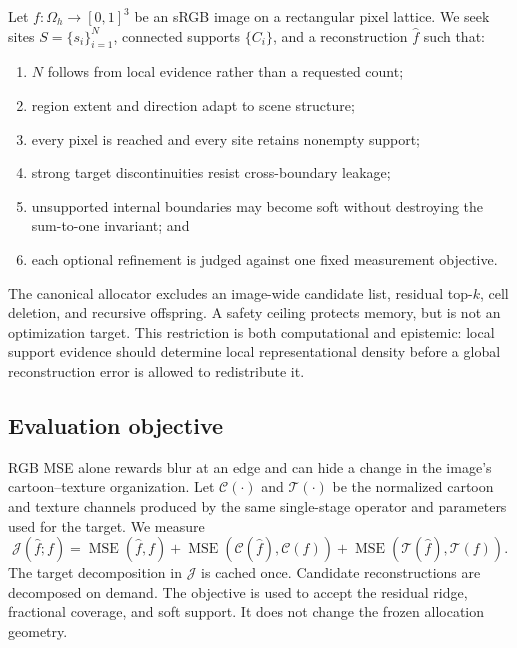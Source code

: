 \documentclass[11pt,letterpaper]{article}
\newcommand{\OmegaD}{\Omega_h}
\begin{document}
Let \(f:\OmegaD\rightarrow[0,1]^3\) be an sRGB image on a rectangular pixel
lattice. We seek sites \(S=\{s_i\}_{i=1}^N\), connected supports
\(\{C_i\}\), and a reconstruction \(\hat f\) such that:
\begin{enumerate}[leftmargin=1.6em,itemsep=0.2em]
  \item \(N\) follows from local evidence rather than a requested count;
  \item region extent and direction adapt to scene structure;
  \item every pixel is reached and every site retains nonempty support;
  \item strong target discontinuities resist cross-boundary leakage;
  \item unsupported internal boundaries may become soft without destroying
        the sum-to-one invariant; and
  \item each optional refinement is judged against one fixed measurement objective.
\end{enumerate}

The canonical allocator excludes an image-wide candidate list, residual top-\(k\),
cell deletion, and recursive offspring. A safety ceiling protects memory, but is not
an optimization target. This restriction is both computational and epistemic: local
support evidence should determine local representational density before a global
reconstruction error is allowed to redistribute it.

\subsection{Evaluation objective}
\label{sec:objective}

RGB MSE alone rewards blur at an edge and can hide a change in the image's
cartoon--texture organization. Let \(\mathcal C(\cdot)\) and \(\mathcal T(\cdot)\)
be the normalized cartoon and texture channels produced by the same single-stage
operator and parameters used for the target. We measure
\begin{equation}
\label{eq:objective}
\mathcal J(\hat f;f)
=
\operatorname{MSE}(\hat f,f)
+\operatorname{MSE}(\mathcal C(\hat f),\mathcal C(f))
+\operatorname{MSE}(\mathcal T(\hat f),\mathcal T(f)).
\end{equation}
The target decomposition in \(\mathcal J\) is cached once. Candidate reconstructions
are decomposed on demand. The objective is used to accept the residual ridge,
fractional coverage, and soft support. It does not change the frozen allocation
geometry.
\end{document}
